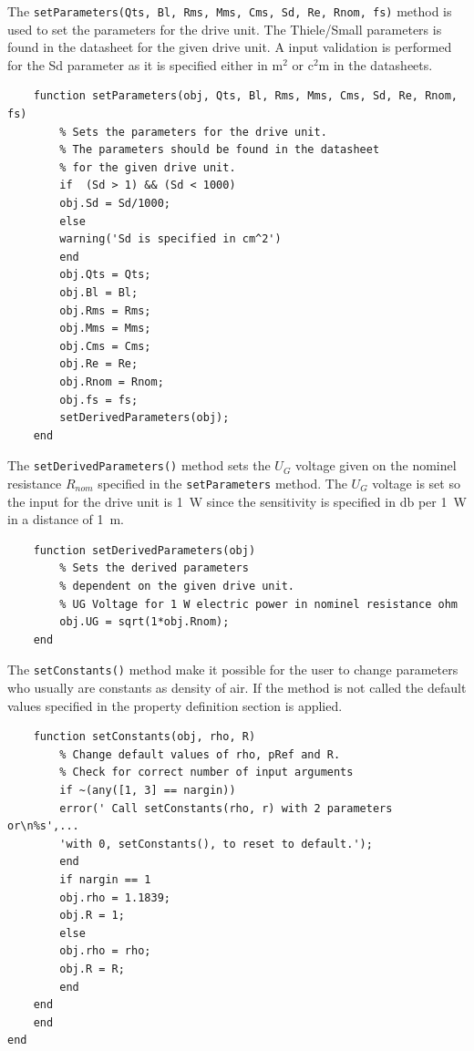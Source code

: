 The \texttt{setParameters(Qts, Bl, Rms, Mms, Cms, Sd, Re, Rnom, fs)} 
\newline method is used to set the parameters for the drive unit.
The Thiele/Small parameters is found in the datasheet for the given drive unit. 
A input validation is performed for the Sd parameter as it is specified either in $\si{\square\meter}$ or $\si{\square\centi\meter}$ in the datasheets.
\begin{verbatim}
	function setParameters(obj, Qts, Bl, Rms, Mms, Cms, Sd, Re, Rnom, fs)
	    % Sets the parameters for the drive unit.
	    % The parameters should be found in the datasheet
	    % for the given drive unit. 
	    if  (Sd > 1) && (Sd < 1000)
		obj.Sd = Sd/1000;
	    else
		warning('Sd is specified in cm^2')
	    end
	    obj.Qts = Qts;
	    obj.Bl = Bl;
	    obj.Rms = Rms;
	    obj.Mms = Mms;
	    obj.Cms = Cms;
	    obj.Re = Re;
	    obj.Rnom = Rnom;
	    obj.fs = fs;
	    setDerivedParameters(obj);
	end
\end{verbatim}

The \texttt{setDerivedParameters()} method sets the $U_G$ voltage given on the nominel resistance $R_{nom}$ specified in the \texttt{setParameters} method. 
The $U_G$ voltage is set so the input for the drive unit is \SI{1}{\watt} since the sensitivity is specified in \si{\decibel} per \SI{1}{\watt} in a distance of \SI{1}{\meter}.
\begin{verbatim}
	function setDerivedParameters(obj)
	    % Sets the derived parameters 
	    % dependent on the given drive unit.
	    % UG Voltage for 1 W electric power in nominel resistance ohm
	    obj.UG = sqrt(1*obj.Rnom);
	end
\end{verbatim}

The \texttt{setConstants()} method make it possible for the user to change parameters who usually are constants as density of air. 
If the method is not called the default values specified in the property definition section is applied.   
\begin{verbatim}
	function setConstants(obj, rho, R)
	    % Change default values of rho, pRef and R.	
	    % Check for correct number of input arguments
	    if ~(any([1, 3] == nargin))
		error(' Call setConstants(rho, r) with 2 parameters or\n%s',...
		'with 0, setConstants(), to reset to default.');
	    end
	    if nargin == 1
		obj.rho = 1.1839;
		obj.R = 1;
	    else
		obj.rho = rho;
		obj.R = R;
	    end
	end
    end
end
\end{verbatim}

